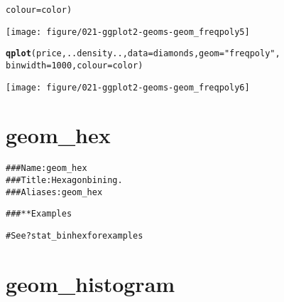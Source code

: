 \documentclass[a4paper,titlepage]{tufte-handout}\usepackage[]{graphicx}\usepackage[]{color}
\makeatletter
\def\maxwidth{ %
  \ifdim\Gin@nat@width>\linewidth
    \linewidth
  \else
    \Gin@nat@width
  \fi
}
\newcommand{\hlnum}[1]{\textcolor[rgb]{0.686,0.059,0.569}{#1}}%
\newcommand{\hlstr}[1]{\textcolor[rgb]{0.192,0.494,0.8}{#1}}%
\newcommand{\hlstd}[1]{\textcolor[rgb]{0.345,0.345,0.345}{#1}}%
\newcommand{\hlkwc}[1]{\textcolor[rgb]{0.333,0.667,0.333}{#1}}%
\newcommand{\hlkwd}[1]{\textcolor[rgb]{0.737,0.353,0.396}{\textbf{#1}}}%
\newenvironment{kframe}{%
 \def\at@end@of@kframe{}%
 \ifinner\ifhmode%
  \def\at@end@of@kframe{\end{minipage}}%
  \begin{minipage}{\columnwidth}%
 \fi\fi%
 \def\FrameCommand##1{\hskip\@totalleftmargin \hskip-\fboxsep
 \colorbox{shadecolor}{##1}\hskip-\fboxsep
     \hskip-\linewidth \hskip-\@totalleftmargin \hskip\columnwidth}%
 \MakeFramed {\advance\hsize-\width
   \@totalleftmargin\z@ \linewidth\hsize
   \@setminipage}}%
 {\par\unskip\endMakeFramed%
 \at@end@of@kframe}
\newenvironment{knitrout}{}{} %
\makeatother
\begin{document}
\begin{knitrout}
\begin{kframe}
\begin{alltt}
  \hlkwc{colour} \hlstd{= color)}
\end{alltt}
\end{kframe}
\texttt{[image: figure/021-ggplot2-geoms-geom\_freqpoly5]} 
\begin{kframe}\begin{alltt}
\hlkwd{qplot}\hlstd{(price, ..density..,} \hlkwc{data} \hlstd{= diamonds,} \hlkwc{geom} \hlstd{=} \hlstr{"freqpoly"}\hlstd{,}
  \hlkwc{binwidth} \hlstd{=} \hlnum{1000}\hlstd{,} \hlkwc{colour} \hlstd{= color)}
\end{alltt}
\end{kframe}
\texttt{[image: figure/021-ggplot2-geoms-geom\_freqpoly6]} 
\begin{kframe}\begin{alltt}


\end{alltt}
\end{kframe}
\end{knitrout}



\section{geom\_hex}

\begin{knitrout}
\color{fgcolor}\begin{kframe}
\begin{alltt}
### Name: geom_hex
### Title: Hexagon bining.
### Aliases: geom_hex

### ** Examples

# See ?stat_binhex for examples



\end{alltt}
\end{kframe}
\end{knitrout}



\section{geom\_histogram}
\end{document}

